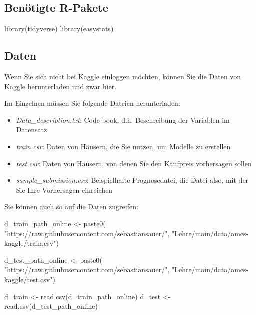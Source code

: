 \documentclass[
  letterpaper,
]{scrbook}
\newenvironment{Shaded}{\begin{snugshade}}{\end{snugshade}}
\newcommand{\FunctionTok}[1]{\textcolor[rgb]{0.28,0.35,0.67}{#1}}
\newcommand{\NormalTok}[1]{\textcolor[rgb]{0.00,0.23,0.31}{#1}}
\newcommand{\OtherTok}[1]{\textcolor[rgb]{0.00,0.23,0.31}{#1}}
\newcommand{\StringTok}[1]{\textcolor[rgb]{0.13,0.47,0.30}{#1}}
\providecommand{\tightlist}{%
  \setlength{\itemsep}{0pt}\setlength{\parskip}{0pt}}\usepackage{longtable,booktabs,array}
\theoremstyle{definition}
\theoremstyle{definition}
\theoremstyle{definition}
\theoremstyle{remark}
\begin{document}
\subsection{Benötigte R-Pakete}\label{benuxf6tigte-r-pakete-6}

\begin{Shaded}
\begin{Highlighting}[]
\FunctionTok{library}\NormalTok{(tidyverse)}
\FunctionTok{library}\NormalTok{(easystats)}
\end{Highlighting}
\end{Shaded}

\subsection{Daten}\label{daten}

Wenn Sie sich nicht bei Kaggle einloggen möchten, können Sie die Daten
von Kaggle herunterladen und zwar
\href{https://www.kaggle.com/competitions/house-prices-advanced-regression-techniques/data}{hier}.

Im Einzelnen müssen Sie folgende Dateien herunterladen:

\begin{itemize}
\tightlist
\item
  \emph{Data\_description.txt}: Code book, d.h. Beschreibung der
  Variablen im Datensatz
\item
  \emph{train.csv}: Daten von Häusern, die Sie nutzen, um Modelle zu
  erstellen
\item
  \emph{test.csv}: Daten von Häusern, von denen Sie den Kaufpreis
  vorhersagen sollen
\item
  \emph{sample\_submission.csv}: Beispielhafte Prognosedatei, die Datei
  also, mit der Sie Ihre Vorhersagen einreichen
\end{itemize}

Sie können auch so auf die Daten zugreifen:

\begin{Shaded}
\begin{Highlighting}[]
\NormalTok{d\_train\_path\_online }\OtherTok{\textless{}{-}} \FunctionTok{paste0}\NormalTok{(}
    \StringTok{"https://raw.githubusercontent.com/sebastiansauer/"}\NormalTok{,}
    \StringTok{"Lehre/main/data/ames{-}kaggle/train.csv"}\NormalTok{)}

\NormalTok{d\_test\_path\_online }\OtherTok{\textless{}{-}} \FunctionTok{paste0}\NormalTok{(}
  \StringTok{"https://raw.githubusercontent.com/sebastiansauer/"}\NormalTok{,}
  \StringTok{"Lehre/main/data/ames{-}kaggle/test.csv"}\NormalTok{)}

\NormalTok{d\_train }\OtherTok{\textless{}{-}} \FunctionTok{read.csv}\NormalTok{(d\_train\_path\_online)}
\NormalTok{d\_test }\OtherTok{\textless{}{-}} \FunctionTok{read.csv}\NormalTok{(d\_test\_path\_online)}
\end{Highlighting}
\end{Shaded}
\end{document}
